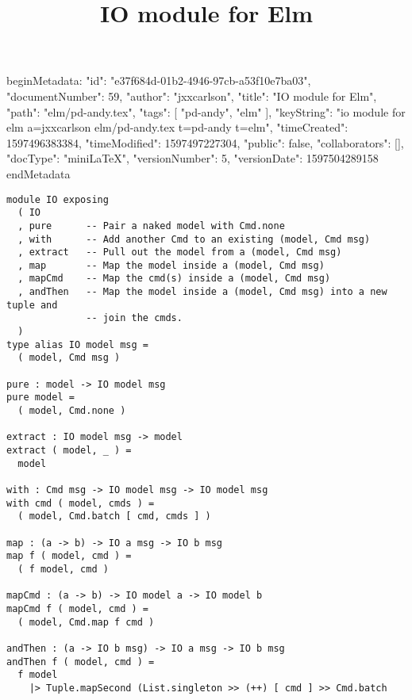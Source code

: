 beginMetadata:
{
    "id": "e37f684d-01b2-4946-97cb-a53f10e7ba03",
    "documentNumber": 59,
    "author": "jxxcarlson",
    "title": "IO module for Elm",
    "path": "elm/pd-andy.tex",
    "tags": [
        "pd-andy",
        "elm"
    ],
    "keyString": "io module for elm a=jxxcarlson elm/pd-andy.tex t=pd-andy t=elm",
    "timeCreated": 1597496383384,
    "timeModified": 1597497227304,
    "public": false,
    "collaborators": [],
    "docType": "miniLaTeX",
    "versionNumber": 5,
    "versionDate": 1597504289158
}
endMetadata
\title{IO module for Elm}

\maketitle 


\begin{verbatim}
module IO exposing
  ( IO
  , pure      -- Pair a naked model with Cmd.none
  , with      -- Add another Cmd to an existing (model, Cmd msg)
  , extract   -- Pull out the model from a (model, Cmd msg)
  , map       -- Map the model inside a (model, Cmd msg)
  , mapCmd    -- Map the cmd(s) inside a (model, Cmd msg)
  , andThen   -- Map the model inside a (model, Cmd msg) into a new tuple and
              -- join the cmds.
  )
type alias IO model msg =
  ( model, Cmd msg )

pure : model -> IO model msg
pure model =
  ( model, Cmd.none )

extract : IO model msg -> model
extract ( model, _ ) =
  model

with : Cmd msg -> IO model msg -> IO model msg
with cmd ( model, cmds ) =
  ( model, Cmd.batch [ cmd, cmds ] )

map : (a -> b) -> IO a msg -> IO b msg
map f ( model, cmd ) =
  ( f model, cmd )

mapCmd : (a -> b) -> IO model a -> IO model b
mapCmd f ( model, cmd ) =
  ( model, Cmd.map f cmd )

andThen : (a -> IO b msg) -> IO a msg -> IO b msg
andThen f ( model, cmd ) =
  f model
    |> Tuple.mapSecond (List.singleton >> (++) [ cmd ] >> Cmd.batch

\end{verbatim}